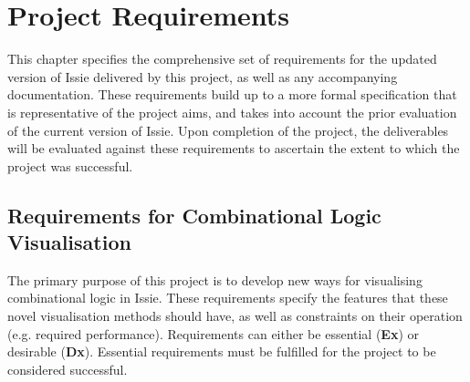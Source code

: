 \chapter{Project Requirements} \label{chap:requirements}
This chapter specifies the comprehensive set of requirements for the updated version of Issie delivered by this project, as well as any accompanying documentation. These requirements build up to a more formal specification that is representative of the project aims, and takes into account the prior evaluation of the current version of Issie. Upon completion of the project, the deliverables will be evaluated against these requirements to ascertain the extent to which the project was successful.

\section{Requirements for Combinational Logic Visualisation}
The primary purpose of this project is to develop new ways for visualising combinational logic in Issie. These requirements specify the features that these novel visualisation methods should have, as well as constraints on their operation (e.g. required performance). Requirements can either be essential (\textbf{Ex}) or desirable (\textbf{Dx}). Essential requirements must be fulfilled for the project to be considered successful.
